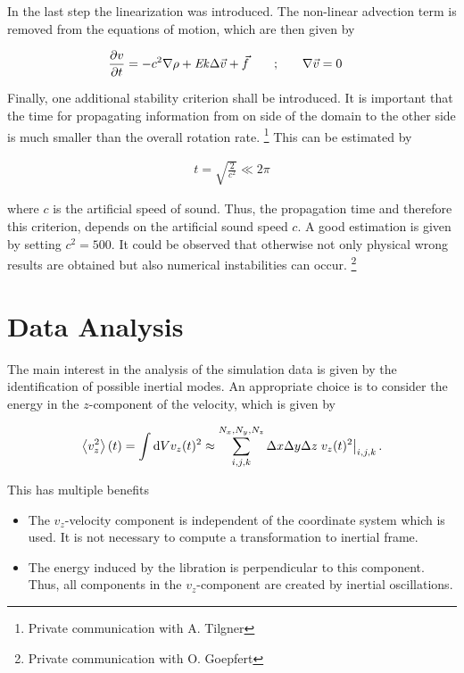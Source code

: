 In the last step the linearization was introduced.
The non-linear advection term is removed from the equations of motion, which
are then given by

\begin{align}
    \label{cone_theorie:rotns}
    \pdn[v]{t} = -c^2\nabla \rho + \Ekman \Delta \vec{v} + \vec{f} \qquad;& \qquad  \nabla \vec{v} = 0
\end{align}

Finally, one additional stability criterion shall be introduced.
It is important that the time for propagating information from on side of the domain
to the other side is much smaller than the overall rotation rate.
\footnote{Private communication with A. Tilgner}
This can be estimated by

\begin{align}
    t = \sqrt{\frac{2}{c^2}} \ll 2\pi
\end{align}

where $c$ is the artificial speed of sound.
Thus, the propagation time and therefore this criterion, depends on the artificial sound speed $c$.
A good estimation is given by setting $c^2 = 500$.
It could be observed that otherwise not only physical wrong results are obtained but also
numerical instabilities can occur.
\footnote{Private communication with O. Goepfert}

\newpage

\section{Data Analysis}

The main interest in the analysis of the simulation data is given by the identification of possible inertial modes.
An appropriate choice is to consider the energy in the $z$-component of the  velocity, which is given by

\begin{align}
    \left<v_z^2 \right>(t) =  \int \mathop{}\!\mathrm{d} V v_z(t)^2 \approx \sum_{i, j, k}^{N_x,N_y,N_z} \Delta x \Delta y \Delta z \left.v_z(t)^2 \right|_{i,j,k}.
\end{align}

This has multiple benefits

\begin{itemize}
    \item The $v_z$-velocity component is independent of the coordinate system which is used. It is not necessary
                to compute a transformation to inertial frame.
    \item The energy induced by the libration is perpendicular to this component. Thus, all components
            in the $v_z$-component are created by inertial oscillations.
\end{itemize}

